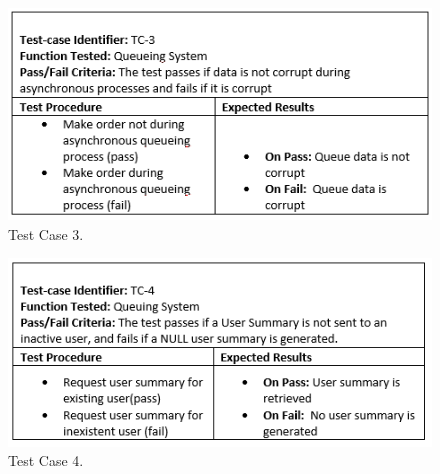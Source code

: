 \begin{figure}[b]
\centering
\includegraphics[width=5in]{./Diagrams/TestCases/tc3.png}
\caption{ Test Case 3.}
\end{figure}

\begin{figure}[b]
\centering
\includegraphics[width=5in]{./Diagrams/TestCases/tc4.png}
\caption{ Test Case 4.}
\end{figure}